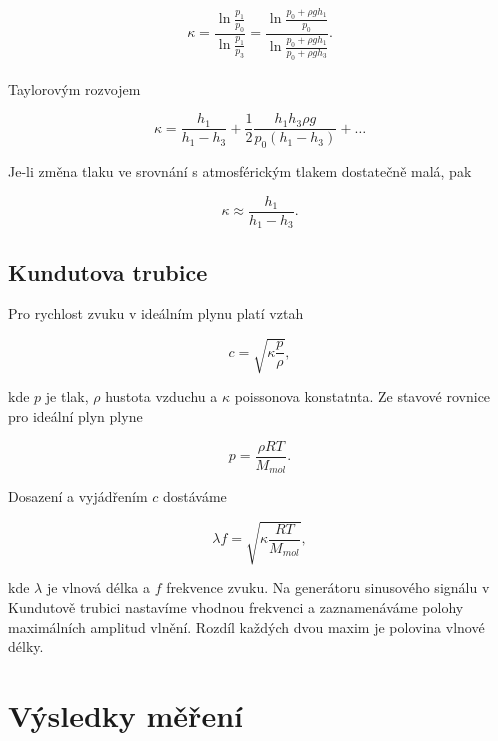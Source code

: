 \documentclass[a4paper,11pt]{article}
\begin{document}
\begin{equation}
  \kappa = \frac{\ln{\frac{p_1}{p_0}}}{\ln{\frac{p_1}{p_3}}} = \frac{\ln{\frac{p_0 + \rho g h_1}{p_0}}}{\ln{\frac{p_0 + \rho g h_1}{p_0 + \rho g h_3}}}.
\end{equation} \\

\noindent
Taylorovým rozvojem

\begin{equation}
  \kappa = \frac{h_1}{h_1 - h_3} + \frac{1}{2} \frac{h_1 h_3 \rho g}{p_0 (h_1 - h_3)} + \ldots
\end{equation}

\noindent
Je-li změna tlaku ve srovnání s atmosférickým tlakem dostatečně malá, pak

\begin{equation}
\kappa \approx \frac{h_1}{h_1 - h_3}.
\end{equation}

\subsection{Kundutova trubice}

Pro rychlost zvuku v ideálním plynu platí vztah

\begin{equation}
c = \sqrt{\kappa \frac{p}{\rho}},
\end{equation}

\noindent
kde $p$ je tlak, $\rho$ hustota vzduchu a  $\kappa$ poissonova konstatnta. Ze stavové rovnice pro ideální plyn plyne

\begin{equation}
  p = \frac{\rho R T}{ M_{mol}}.
\end{equation}

\noindent
Dosazení a vyjádřením $c$ dostáváme

\begin{equation}
   \lambda f = \sqrt{\kappa \frac{RT}{M_{mol}}},
\end{equation}

\noindent
kde $\lambda$ je vlnová délka a $f$ frekvence zvuku. 
Na generátoru sinusového signálu v Kundutově trubici nastavíme vhodnou frekvenci a zaznamenáváme polohy maximálních amplitud vlnění.
Rozdíl každých dvou maxim je polovina vlnové délky.

\newpage

\section{Výsledky měření}
\end{document}
